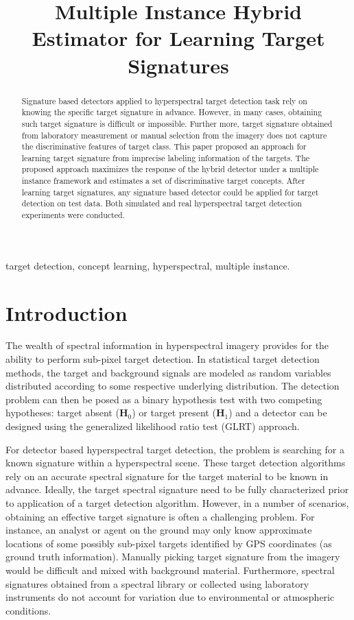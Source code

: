\documentclass{article}
\title{Multiple Instance Hybrid Estimator for Learning Target Signatures}
\begin{document}
	\maketitle
	\begin{abstract}
	Signature based detectors applied to hyperspectral target detection task rely on knowing the specific target signature in advance. However, in many cases, obtaining such target signature is difficult or impossible. Further more, target signature obtained from laboratory measurement or manual selection from the imagery does not capture the discriminative features of target class. This paper proposed an approach for learning target signature from imprecise labeling information of the targets. The proposed approach maximizes the response of the hybrid detector under a multiple instance framework and estimates a set of discriminative target concepts. After learning target signatures, any signature based detector could be applied for target detection on test data. Both simulated and real hyperspectral target detection experiments were conducted. 
		
	\end{abstract}
	\begin{keywords}
		target detection, concept learning, hyperspectral, multiple instance.
	\end{keywords}
	\section{Introduction}
	\label{sec:intro}
	The wealth of spectral information in hyperspectral imagery provides for the ability to perform sub-pixel target detection.   In statistical target detection methods, the target and background signals are modeled as random variables distributed according to some respective underlying distribution.  The detection problem can then be posed as a binary hypothesis test with two competing hypotheses: target absent ($\boldsymbol{H}_0$) or target present ($\boldsymbol{H}_1$) and a detector can be designed using the generalized likelihood ratio test (GLRT) approach.%
	
	
	For detector based hyperspectral target detection, the problem is searching for a known signature within a hyperspectral scene. These target detection algorithms rely on an accurate  spectral signature for the target material to be known in advance. Ideally, the target spectral signature need to be fully characterized prior to application of a target detection algorithm. However, in a number of scenarios, obtaining an effective target signature is often a challenging problem.  For instance, an analyst or agent on the ground may only know approximate locations of some possibly sub-pixel targets identified by GPS coordinates (as ground truth information). Manually picking target signature from the imagery would be difficult and mixed with background material. Furthermore, spectral signatures obtained from a spectral library or collected using laboratory instruments do not account for variation due to environmental or atmospheric conditions.
	
\end{document}
